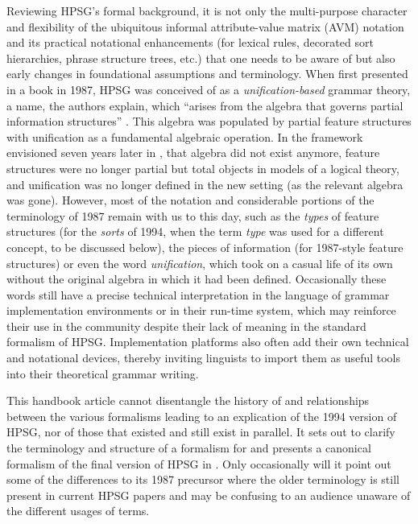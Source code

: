 \documentclass[output=paper
                ,modfonts
                ,nonflat
	        ,collection
	        ,collectionchapter
	        ,collectiontoclongg
 	        ,biblatex
                ,babelshorthands
                ,newtxmath
                ,draftmode
                ,colorlinks, citecolor=brown
]{./langsci/langscibook}
\begin{document}
{Reviewing HPSG's formal background,
it is not only the multi-purpose character and flexibility of the ubiquitous informal attribute-value matrix (AVM) notation and its
practical notational enhancements (for lexical rules, decorated sort
hierarchies, phrase structure trees, etc.) that one needs to be
aware of but also early changes in
foundational assumptions and terminology.
When first presented in a book in 1987, HPSG was conceived of as a
\emph{unification-based} grammar theory, a name, the authors
explain, which ``arises from the algebra that governs partial
information structures'' \citep[7]{PollardSag1987}. This algebra was
populated by partial feature structures with unification as a
fundamental algebraic operation. In the framework envisioned seven
years later in \citet{PollardSag1994},
that algebra did not exist anymore, feature structures were no longer
partial but total objects in models of a logical theory, and
unification was no longer defined in the new setting (as the relevant
algebra was gone). However, most of the notation and considerable
portions of the terminology of 1987 remain with us to this day, such as the
\emph{types} of feature structures (for the \emph{sorts} of 1994,
when the term \emph{type} was used for a different concept, to be
discussed below), the pieces of information (for 1987-style feature
structures) or even the word \emph{unification}, which took on a
casual life of its own without the original algebra in
which it had been defined. Occasionally these words still have a
precise technical interpretation in the language of grammar
implementation environments or in their run-time system, which may
reinforce their use in the community despite their lack of meaning in
the standard formalism of HPSG. Implementation platforms also often add
their own technical and notational devices, thereby
inviting linguists to import them as useful tools into their theoretical grammar
writing.



This handbook article cannot disentangle the history of and relationships
between the various formalisms leading to an explication of the
1994 version of HPSG, nor of those that existed and still exist in
parallel. It sets out to clarify the terminology and
structure of a formalism for \cite{PollardSag1994} and
presents a canonical formalism of the final version of
HPSG in \cite{PollardSag1994}. Only occasionally will it point out some of
the differences to its 1987 precursor where
the older terminology is still present in current HPSG papers and
may be confusing to an audience unaware of the different
usages of terms.

}
\end{document}
